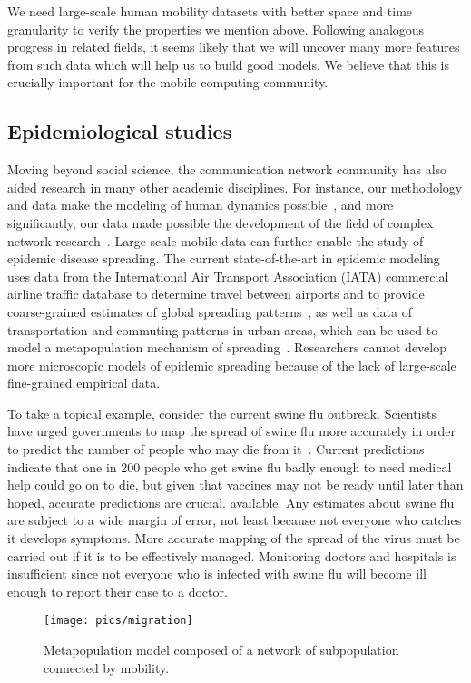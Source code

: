 \documentclass{sig-alternate-10pt}
\begin{document}
We need large-scale human mobility datasets with better space and time
granularity to verify the properties we mention above.  Following
analogous progress in related fields, it seems likely that we
will uncover many more features from such data which will help us to
build good models.  We believe that this is crucially important for
the mobile computing community.
\vspace{-1mm}
\subsection{Epidemiological studies}
\vspace{-1mm}
Moving beyond social science, the communication network community has
also aided research in many other academic disciplines.  For instance,
our methodology and data make the modeling of human dynamics
possible~\cite{vazquez-2006-73}, and more significantly, our data made
possible the development of the field of complex network
research~\cite{albert-1999-401}.  Large-scale mobile data can further
enable the study of epidemic disease spreading. The current state-of-the-art in
epidemic modeling uses data from the International Air Transport
Association (IATA) commercial airline traffic database
to determine travel between airports and to provide coarse-grained estimates of
global spreading patterns~\cite{colizza-2007-5}, as well as data of
transportation and commuting patterns in urban areas, which can be
used to model a metapopulation mechanism of
spreading~\cite{colizza-2008-251}.  Researchers cannot develop more
microscopic models of epidemic spreading because of the lack of
large-scale fine-grained empirical data.


To take a topical example, consider the current swine flu outbreak.
Scientists have urged governments to map the spread of
swine flu more accurately in order to predict the number of people who
may die from it~\cite{garske:severity}.
Current predictions indicate that one in 200 people who get swine flu badly enough to
need medical help could go on to die, but given that vaccines may not be ready until
later than hoped, accurate predictions are crucial.
available.
Any estimates about swine flu are subject to a wide margin
of error, not least because not everyone who catches it develops
symptoms. More accurate mapping of the spread of the virus must be
carried out if it is to be effectively managed. Monitoring doctors and
hospitals is insufficient since not everyone who is
infected with swine flu will become ill enough to report their case to
a doctor.
\begin{figure}[t]
\begin{center}
\texttt{[image: pics/migration]}\vspace{-1mm}
\caption{\label{migration} Metapopulation model composed of a network of subpopulation connected by mobility.}
\vspace{-3mm}
\end{center}
\vspace{-4mm}
\end{figure}
\end{document}
